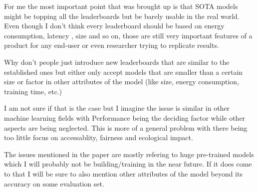 \documentclass[a4]{article}
\begin{document}

For me the most important point that was brought up is that SOTA models might be topping all the leaderboards but be barely usable in the real world. Even though I don't think every leaderboard should be based on energy consumption, latency , size and so on, those are still very important features of a product for any end-user or even researcher trying to replicate results.



Why don't people just introduce new leaderboards that are similar to the established ones but either only accept models that are smaller than a certain size or factor in other attributes of the model (like size, energy consumption, training time, etc.)


I am not sure if that is the case but I imagine the issue is similar in other machine learning fields with Performance being the deciding factor while other aspects are being neglected. This is more of a general problem with there being too little focus on accessablity, fairness and ecological impact.


The issues mentioned in the paper are mostly refering to huge pre-trained models which I will probably not be building/training in the near future. If it does come to that I will be sure to also mention other attributes of the model beyond its accuracy on some evaluation set.
\end{document}
